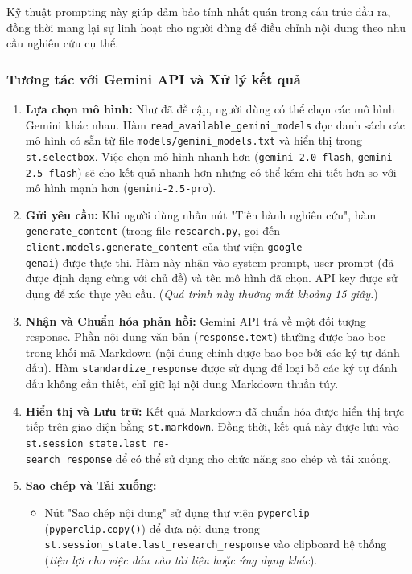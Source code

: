 Kỹ thuật prompting này giúp đảm bảo tính nhất quán trong cấu trúc đầu ra, đồng thời mang lại sự linh hoạt cho người dùng để điều chỉnh nội dung theo nhu cầu nghiên cứu cụ thể.

\subsubsection{Tương tác với Gemini API và Xử lý kết quả}
\begin{enumerate}
    \item \textbf{Lựa chọn mô hình:} Như đã đề cập, người dùng có thể chọn các mô hình Gemini khác nhau. Hàm \texttt{read\_available\_gemini\_models} đọc danh sách các mô hình có sẵn từ file \texttt{models/gemini\_models.txt} và hiển thị trong \texttt{st.selectbox}. Việc chọn mô hình nhanh hơn (\texttt{gemini-2.0-flash}, \texttt{gemini-2.5-flash}) sẽ cho kết quả nhanh hơn nhưng có thể kém chi tiết hơn so với mô hình mạnh hơn (\texttt{gemini-2.5-pro}).
    
    \item \textbf{Gửi yêu cầu:} Khi người dùng nhấn nút "Tiến hành nghiên cứu", hàm \texttt{generate\_content} (trong file \texttt{research.py}, gọi đến \texttt{client.models.generate\_content} của thư viện \texttt{google-\\genai}) được thực thi. Hàm này nhận vào system prompt, user prompt (đã được định dạng cùng với chủ đề) và tên mô hình đã chọn. API key được sử dụng để xác thực yêu cầu. (\textit{Quá trình này thường mất khoảng 15 giây.})
    
    \item \textbf{Nhận và Chuẩn hóa phản hồi:} Gemini API trả về một đối tượng response. Phần nội dung văn bản (\texttt{response.text}) thường được bao bọc trong khối mã Markdown (nội dung chính được bao bọc bởi các ký tự đánh dấu). Hàm \texttt{standardize\_response} được sử dụng để loại bỏ các ký tự đánh dấu không cần thiết, chỉ giữ lại nội dung Markdown thuần túy.
    
    \item \textbf{Hiển thị và Lưu trữ:} Kết quả Markdown đã chuẩn hóa được hiển thị trực tiếp trên giao diện bằng \texttt{st.markdown}. Đồng thời, kết quả này được lưu vào \texttt{st.session\_state.last\_re-\\search\_response} để có thể sử dụng cho chức năng sao chép và tải xuống.
    
    \item \textbf{Sao chép và Tải xuống:}
    \begin{itemize}
        \item Nút "Sao chép nội dung" sử dụng thư viện \texttt{pyperclip} (\texttt{pyperclip.copy()}) để đưa nội dung trong \texttt{st.session\_state.last\_research\_response} vào clipboard hệ thống (\textit{tiện lợi cho việc dán vào tài liệu hoặc ứng dụng khác}).
        

\end{itemize}
\end{enumerate}
